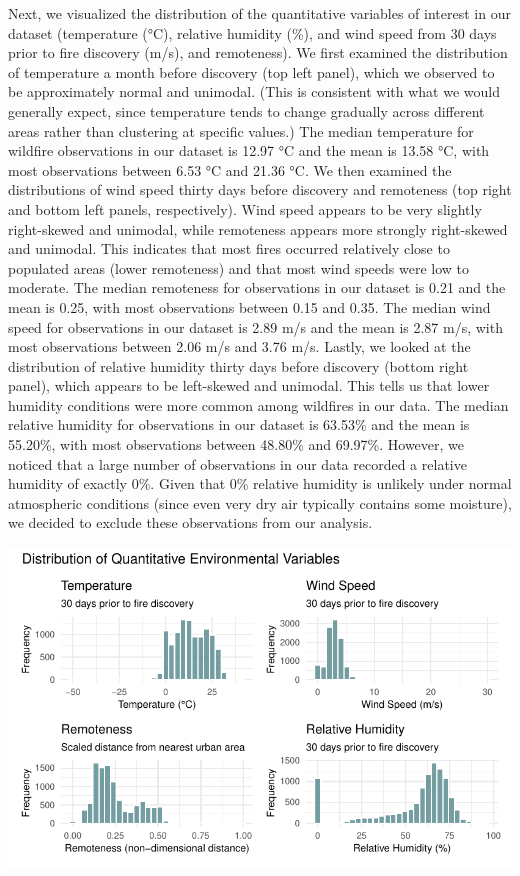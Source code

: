 \documentclass[
  letterpaper,
  DIV=11,
  numbers=noendperiod]{scrartcl}
\begin{document}
Next, we visualized the distribution of the quantitative variables of
interest in our dataset (temperature (°C), relative humidity (\%), and
wind speed from 30 days prior to fire discovery (m/s), and remoteness).
We first examined the distribution of temperature a month before
discovery (top left panel), which we observed to be approximately normal
and unimodal. (This is consistent with what we would generally expect,
since temperature tends to change gradually across different areas
rather than clustering at specific values.) The median temperature for
wildfire observations in our dataset is 12.97 °C and the mean is 13.58
°C, with most observations between 6.53 °C and 21.36 °C. We then
examined the distributions of wind speed thirty days before discovery
and remoteness (top right and bottom left panels, respectively). Wind
speed appears to be very slightly right-skewed and unimodal, while
remoteness appears more strongly right-skewed and unimodal. This
indicates that most fires occurred relatively close to populated areas
(lower remoteness) and that most wind speeds were low to moderate. The
median remoteness for observations in our dataset is 0.21 and the mean
is 0.25, with most observations between 0.15 and 0.35. The median wind
speed for observations in our dataset is 2.89 m/s and the mean is 2.87
m/s, with most observations between 2.06 m/s and 3.76 m/s. Lastly, we
looked at the distribution of relative humidity thirty days before
discovery (bottom right panel), which appears to be left-skewed and
unimodal. This tells us that lower humidity conditions were more common
among wildfires in our data. The median relative humidity for
observations in our dataset is 63.53\% and the mean is 55.20\%, with
most observations between 48.80\% and 69.97\%. However, we noticed that
a large number of observations in our data recorded a relative humidity
of exactly 0\%. Given that 0\% relative humidity is unlikely under
normal atmospheric conditions (since even very dry air typically
contains some moisture), we decided to exclude these observations from
our analysis.

\includegraphics{written-report_files/figure-pdf/quantitative-univariate-eda-1.pdf}
\end{document}
